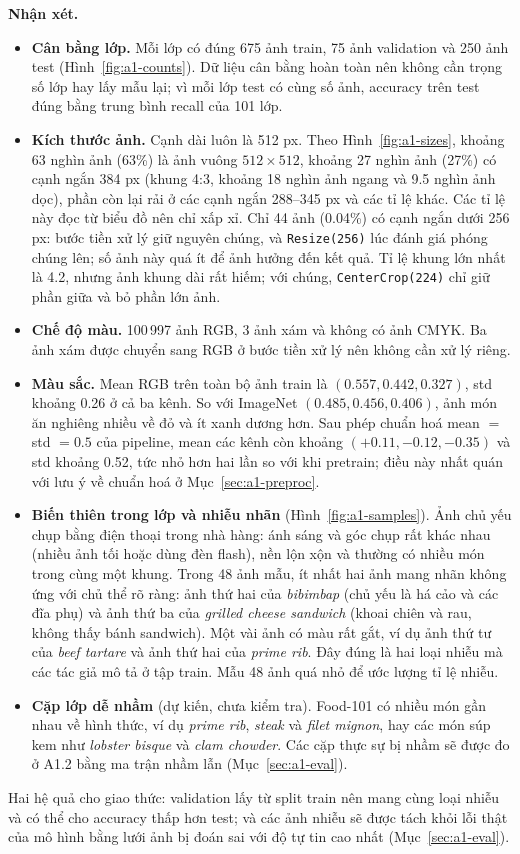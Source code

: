 \textbf{Nhận xét.}
\begin{itemize}
\item \textbf{Cân bằng lớp.} Mỗi lớp có đúng 675 ảnh train, 75 ảnh validation và 250 ảnh test (Hình~\ref{fig:a1-counts}). Dữ liệu cân bằng hoàn toàn nên không cần trọng số lớp hay lấy mẫu lại; vì mỗi lớp test có cùng số ảnh, accuracy trên test đúng bằng trung bình recall của 101 lớp.
\item \textbf{Kích thước ảnh.} Cạnh dài luôn là 512 px. Theo Hình~\ref{fig:a1-sizes}, khoảng 63 nghìn ảnh (63\%) là ảnh vuông \(512\times512\), khoảng 27 nghìn ảnh (27\%) có cạnh ngắn 384 px (khung 4:3, khoảng 18 nghìn ảnh ngang và 9.5 nghìn ảnh dọc), phần còn lại rải ở các cạnh ngắn 288--345 px và các tỉ lệ khác. Các tỉ lệ này đọc từ biểu đồ nên chỉ xấp xỉ. Chỉ 44 ảnh (0.04\%) có cạnh ngắn dưới 256 px: bước tiền xử lý giữ nguyên chúng, và \texttt{Resize(256)} lúc đánh giá phóng chúng lên; số ảnh này quá ít để ảnh hưởng đến kết quả. Tỉ lệ khung lớn nhất là 4.2, nhưng ảnh khung dài rất hiếm; với chúng, \texttt{CenterCrop(224)} chỉ giữ phần giữa và bỏ phần lớn ảnh.
\item \textbf{Chế độ màu.} 100\,997 ảnh RGB, 3 ảnh xám và không có ảnh CMYK. Ba ảnh xám được chuyển sang RGB ở bước tiền xử lý nên không cần xử lý riêng.
\item \textbf{Màu sắc.} Mean RGB trên toàn bộ ảnh train là \((0.557, 0.442, 0.327)\), std khoảng 0.26 ở cả ba kênh. So với ImageNet \((0.485, 0.456, 0.406)\), ảnh món ăn nghiêng nhiều về đỏ và ít xanh dương hơn. Sau phép chuẩn hoá mean \(=\) std \(=0.5\) của pipeline, mean các kênh còn khoảng \((+0.11, -0.12, -0.35)\) và std khoảng 0.52, tức nhỏ hơn hai lần so với khi pretrain; điều này nhất quán với lưu ý về chuẩn hoá ở Mục~\ref{sec:a1-preproc}.
\item \textbf{Biến thiên trong lớp và nhiễu nhãn} (Hình~\ref{fig:a1-samples}). Ảnh chủ yếu chụp bằng điện thoại trong nhà hàng: ánh sáng và góc chụp rất khác nhau (nhiều ảnh tối hoặc dùng đèn flash), nền lộn xộn và thường có nhiều món trong cùng một khung. Trong 48 ảnh mẫu, ít nhất hai ảnh mang nhãn không ứng với chủ thể rõ ràng: ảnh thứ hai của \emph{bibimbap} (chủ yếu là há cảo và các đĩa phụ) và ảnh thứ ba của \emph{grilled cheese sandwich} (khoai chiên và rau, không thấy bánh sandwich). Một vài ảnh có màu rất gắt, ví dụ ảnh thứ tư của \emph{beef tartare} và ảnh thứ hai của \emph{prime rib}. Đây đúng là hai loại nhiễu mà các tác giả mô tả ở tập train. Mẫu 48 ảnh quá nhỏ để ước lượng tỉ lệ nhiễu.
\item \textbf{Cặp lớp dễ nhầm} (dự kiến, chưa kiểm tra). Food-101 có nhiều món gần nhau về hình thức, ví dụ \emph{prime rib}, \emph{steak} và \emph{filet mignon}, hay các món súp kem như \emph{lobster bisque} và \emph{clam chowder}. Các cặp thực sự bị nhầm sẽ được đo ở A1.2 bằng ma trận nhầm lẫn (Mục~\ref{sec:a1-eval}).
\end{itemize}
Hai hệ quả cho giao thức: validation lấy từ split train nên mang cùng loại nhiễu và có thể cho accuracy thấp hơn test; và các ảnh nhiễu sẽ được tách khỏi lỗi thật của mô hình bằng lưới ảnh bị đoán sai với độ tự tin cao nhất (Mục~\ref{sec:a1-eval}).

